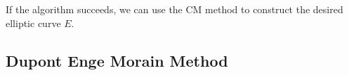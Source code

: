 \documentclass[12pt,twoside]{article}
\begin{document}
 If the algorithm succeeds, we can use the CM method to construct the desired elliptic curve $E$.



\subsection{Dupont Enge Morain Method}




 

\end{document}
